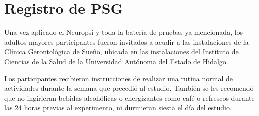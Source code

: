 
\section{Registro de PSG}

Una vez aplicado el Neuropsi y toda la bater\'ia de pruebas ya mencionada, los adultos mayores
participantes fueron invitados a acudir a las instalaciones de la Cl\'inica Gerontol\'ogica de 
Sue\~no, ubicada en las instalaciones del Instituto de Ciencias de la Salud de la Universidad 
Aut\'onoma del Estado de Hidalgo.

Los participantes recibieron instrucciones de realizar una rutina normal de actividades durante la 
semana que precedi\'o al estudio. Tambi\'en se les recomend\'o que no ingirieran bebidas 
alcoh\'olicas o energizantes como caf\'e o refrescos durante las 24 horas previas al experimento, 
ni durmieran siesta el d\'ia del estudio. 


